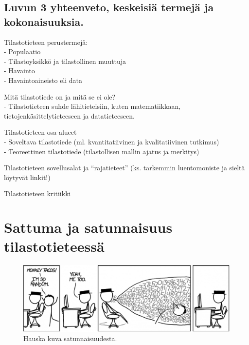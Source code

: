 \documentclass[
]{book}
\begin{document}
\hypertarget{luvun-3-yhteenveto-keskeisiuxe4-termejuxe4-ja-kokonaisuuksia.}{%
\section{Luvun 3 yhteenveto, keskeisiä termejä ja kokonaisuuksia.}\label{luvun-3-yhteenveto-keskeisiuxe4-termejuxe4-ja-kokonaisuuksia.}}

Tilastotieteen perustermejä:\\
- Populaatio\\
- Tilastoyksikkö ja tilastollinen muuttuja\\
- Havainto\\
- Havaintoaineisto eli data

Mitä tilastotiede on ja mitä se ei ole?\\
- Tilastotieteen suhde lähitieteisiin, kuten matematiikkaan, tietojenkäsittelytieteeseen ja datatieteeseen.

Tilastotieteen osa-alueet\\
- Soveltava tilastotiede (ml. kvantitatiivinen ja kvalitatiivinen tutkimus)\\
- Teoreettinen tilastotiede (tilastollisen mallin ajatus ja merkitys)

Tilastotieteen sovellusalat ja ``rajatieteet'' (ks. tarkemmin luentomoniste ja sieltä löytyvät linkit!)

Tilastotieteen kritiikki


\hypertarget{luku4}{%
\chapter{Sattuma ja satunnaisuus tilastotieteessä}\label{luku4}}

\begin{figure}

{\centering \includegraphics[width=1\linewidth]{images/im_so_random} 

}

\caption{Hauska kuva satunnaisuudesta.}\label{fig:random}
\end{figure}
\end{document}
